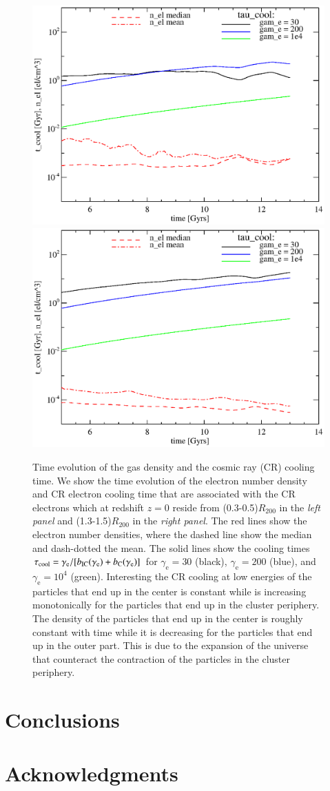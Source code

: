 \documentclass[useAMS,usenatbib]{mn2e}
\newcommand{\e}{\mathrm{e}}
\newcommand{\IC}{\mathrm{IC}}
\newcommand{\rvir}{R_{200}}
\begin{document}
\begin{figure}
\begin{minipage}{2.0\columnwidth}
  \includegraphics[width=0.49\columnwidth]{./figures/evolution.0.3Rv.eps}
  \includegraphics[width=0.49\columnwidth]{./figures/evolution.1.4Rv.eps}
  \caption{Time evolution of the gas density and the cosmic ray (CR)
    cooling time. We show the time evolution of the electron number
    density and CR electron cooling time that are associated with the
    CR electrons which at redshift $z=0$ reside from (0.3-0.5)$\rvir$
    in the {\it left panel} and (1.3-1.5)$\rvir$ in the {\it right
      panel}. The red lines show the electron number densities, where
    the dashed line show the median and dash-dotted the mean. The
    solid lines show the cooling times
    $\tau_\rmn{cool}=\gamma_\e/[b_\IC(\gamma_\e)+b_\rmn{C}(\gamma_\e)]$
    for $\gamma_\e=30$ (black), $\gamma_\e=200$ (blue), and
    $\gamma_\e=10^4$ (green). Interesting the CR cooling at low
    energies of the particles that end up in the center is constant
    while is increasing monotonically for the particles that end up in
    the cluster periphery. The density of the particles that end up in
    the center is roughly constant with time while it is decreasing
    for the particles that end up in the outer part. This is due to
    the expansion of the universe that counteract the contraction of
    the particles in the cluster periphery. \label{fig:evol}}
\end{minipage}
\end{figure}

\section{Conclusions}
\label{sect:conclusions}

\section*{Acknowledgments}




\appendix

\bsp

\label{lastpage}
\end{document}
